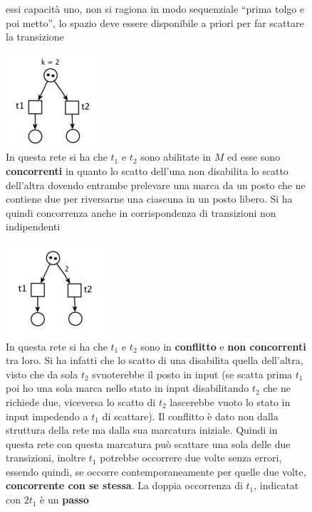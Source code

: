 \documentclass[a4paper,12pt, oneside]{book}
\begin{document}
\begin{esempio}
\begin{figure}[H]
{      essi capacità uno, non si ragiona in modo sequenziale ``prima tolgo e poi
      metto'', lo spazio deve essere disponibile a priori per far scattare la
      transizione} 
  \end{figure}
  \newpage
  \begin{figure}[H]
    \centering
    \includegraphics[scale = 0.6]{img/pt25.jpg}
    \caption{In questa rete si ha che $t_1$ e $t_2$ sono abilitate in $M$ ed
      esse sono \textbf{concorrenti} in quanto lo scatto dell'una non disabilita
      lo scatto dell'altra dovendo entrambe prelevare una marca da un posto che
      ne contiene due per riversarne una ciascuna in un posto libero. Si ha
      quindi concorrenza anche in corrispondenza di transizioni non
      indipendenti}  
  \end{figure}
  \begin{figure}[H]
    \centering
    \includegraphics[scale = 0.55]{img/pt26.jpg}
    \caption{In questa rete si ha che $t_1$ e $t_2$ sono in \textbf{conflitto} e
      \textbf{non concorrenti} tra loro. Si ha infatti che lo scatto di una
      disabilita quella dell'altra, visto che da sola $t_2$ svuoterebbe il posto
      in input (se scatta prima $t_1$ poi ho una sola marca nello stato in input
      disabilitando $t_2$ che ne richiede due, viceversa lo scatto di $t_2$
      lascerebbe vuoto lo stato in input impedendo a $t_1$ di scattare). Il
      conflitto è dato non dalla struttura della rete ma dalla sua marcatura
      iniziale. Quindi in questa rete con questa marcatura può scattare una sola
      delle due transizioni, inoltre $t_1$ potrebbe occorrere due volte senza
      errori, essendo quindi, se occorre contemporaneamente per quelle due volte,
      \textbf{concorrente con se stessa}. La doppia occorrenza di $t_1$, indicatat
      con $2t_1$ è un \textbf{passo}}  

\end{figure}
\end{esempio}
\end{document}
